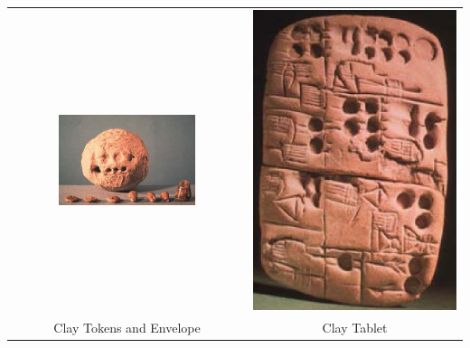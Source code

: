 \documentclass[a4paper,landscape,headrule,footrule,xetex]{foils}
\begin{document}
\newpage
\noindent\begin{tabular}{cc}
\includegraphics[width=0.6\textwidth]{../pics/clay-envelope.eps} &
\includegraphics[height=0.9\textheight]{../pics/clay-tablet.eps} \\
Clay Tokens and Envelope & Clay Tablet\\
\end{tabular}
\end{document}
